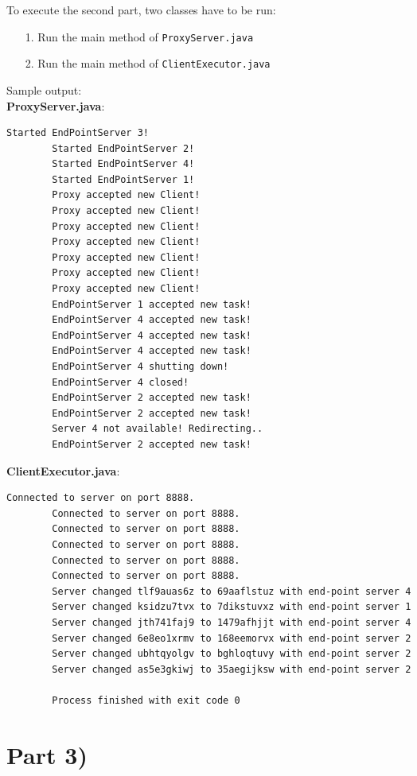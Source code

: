 \documentclass{article}
\begin{document}
      To execute the second part, two classes have to be run:
      \begin{itemize}
      	\item[1.] Run the main method of \texttt{ProxyServer.java}
      	\item[2.] Run the main method of \texttt{ClientExecutor.java}
      \end{itemize}
      Sample output:\\
      \textbf{ProxyServer.java}:\\
      \begin{lstlisting}[language=sh]
        Started EndPointServer 3!
        Started EndPointServer 2!
        Started EndPointServer 4!
        Started EndPointServer 1!
        Proxy accepted new Client!
        Proxy accepted new Client!
        Proxy accepted new Client!
        Proxy accepted new Client!
        Proxy accepted new Client!
        Proxy accepted new Client!
        Proxy accepted new Client!
        EndPointServer 1 accepted new task!
        EndPointServer 4 accepted new task!
        EndPointServer 4 accepted new task!
        EndPointServer 4 accepted new task!
        EndPointServer 4 shutting down!
        EndPointServer 4 closed!
        EndPointServer 2 accepted new task!
        EndPointServer 2 accepted new task!
        Server 4 not available! Redirecting..
        EndPointServer 2 accepted new task!
      \end{lstlisting}
      \textbf{ClientExecutor.java}:\\
      \begin{lstlisting}[language=sh]
        Connected to server on port 8888.
        Connected to server on port 8888.
        Connected to server on port 8888.
        Connected to server on port 8888.
        Connected to server on port 8888.
        Connected to server on port 8888.
        Server changed tlf9auas6z to 69aaflstuz with end-point server 4
        Server changed ksidzu7tvx to 7dikstuvxz with end-point server 1
        Server changed jth741faj9 to 1479afhjjt with end-point server 4
        Server changed 6e8eo1xrmv to 168eemorvx with end-point server 2
        Server changed ubhtqyolgv to bghloqtuvy with end-point server 2
        Server changed as5e3gkiwj to 35aegijksw with end-point server 2
        
        Process finished with exit code 0
      \end{lstlisting}
      
  \section*{Part 3)}
  
\end{document}
